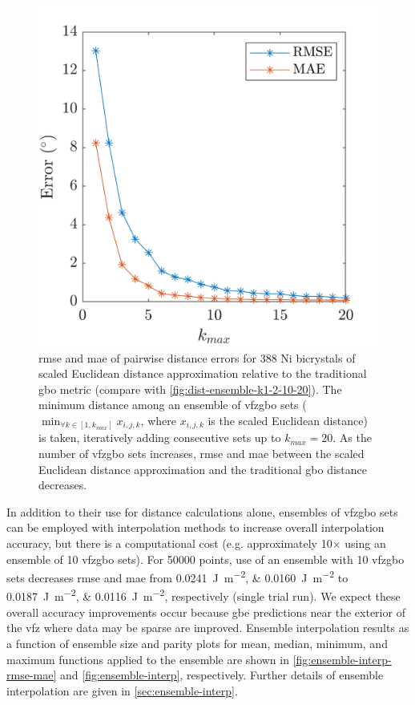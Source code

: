 \documentclass[final,twocolumn,12pt]{elsarticle}
\begin{document}
\begin{figure}[ht]
    \centering
    \includegraphics[scale=1]{figures/dist-ensemble-rmse-mae.png}
    \caption{\Gls{rmse} and \gls{mae} of pairwise distance errors for 388 Ni bicrystals \cite{olmstedSurveyComputedGrain2009} of scaled Euclidean distance approximation relative to the traditional \gls{gbo} metric \cite{chesserLearningGrainBoundary2020} (compare with \cref{fig:dist-ensemble-k1-2-10-20}). The minimum distance among an ensemble of \gls{vfzgbo} sets ($\min_{\forall k \in [1,k_{max}]}x_{i,j,k}$, where $x_{i,j,k}$ is the scaled Euclidean distance) is taken, iteratively adding consecutive sets up to $k_{max} = 20$. As the number of \gls{vfzgbo} sets increases, \gls{rmse} and \gls{mae} between the scaled Euclidean distance approximation and the traditional \gls{gbo} distance decreases.}
    \label{fig:dist-ensemble-rmse-mae}
\end{figure}

In addition to their use for distance calculations alone, ensembles of \gls{vfzgbo} sets can be employed with interpolation methods to increase overall interpolation accuracy, but there is a computational cost (e.g. approximately 10$\times$ using an ensemble of 10 \gls{vfzgbo} sets). For \num{50000} \inpt{} points, use of an ensemble with 10 \gls{vfzgbo} sets decreases \gls{rmse} and \gls{mae} from \SIlist{0.0241;0.0160}{\J\per\square\m} to \SIlist{0.0187;0.0116}{\J\per\square\m}, respectively (single trial run). We expect these overall accuracy improvements occur because \gls{gbe} predictions near the exterior of the \gls{vfz} where data may be sparse are improved. Ensemble interpolation results as a function of ensemble size and parity plots for mean, median, minimum, and maximum functions applied to the ensemble are shown in \cref{fig:ensemble-interp-rmse-mae} and \cref{fig:ensemble-interp}, respectively. Further details of ensemble interpolation are given in \cref{sec:ensemble-interp}.
\end{document}
